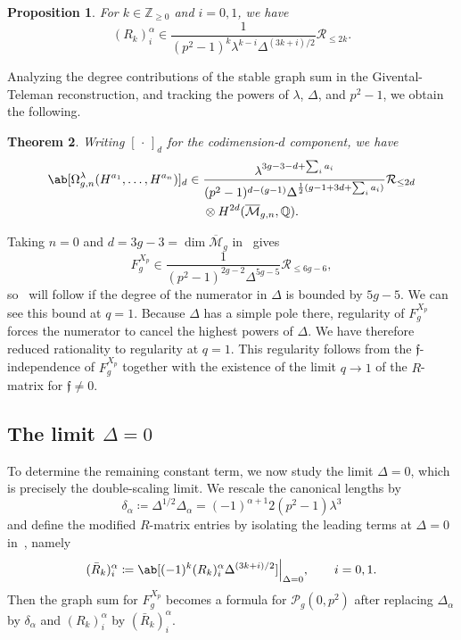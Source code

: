 \documentclass{amsart}
\newtheorem{thm}{Theorem}[section]
\newtheorem{prop}[thm]{Proposition}
\theoremstyle{definition}
\theoremstyle{remark}
\theoremstyle{plain}
\theoremstyle{definition}
\theoremstyle{remark}
\newcommand{\Z}{\mathbb{Z}}
\newcommand{\Q}{\mathbb{Q}}
\newcommand{\Mbar}{\overline{\mathcal{M}}}
\newcommand{\mc}[1]{\mathcal{#1}}
\newcommand{\mf}[1]{\mathfrak{#1}}
\newcommand{\1}{\mathbf{1}}
\newcommand{\2}{\mathbf{2}}
\newcommand{\3}{\mathbf{3}}
\begin{document}
\begin{prop}%
\label{prop:R matrix polynomiality}
    For \(k \in \Z_{\geq0}\) and \(i = 0,1\), we have
    \[ (R_k)_i^{\alpha} \in \frac{1}{(p^2-1)^k \lambda^{k-i}\Delta^{(3k+i)/2}}\mc{R}_{\leq 2k}. \]
\end{prop}

Analyzing the degree contributions of the stable graph sum in the Givental-Teleman reconstruction, and tracking the powers of \(\lambda\), \(\Delta\), and \(p^2-1\), we obtain the following.

\begin{thm}%
\label{thm:local P1 reconstruction}
    Writing \([\,\cdot\,]_d\) for the codimension-\(d\) component, we have
    \begin{align*}
        \ab[\Omega^{\lambda}_{g,n}(H^{a_1},\ldots,H^{a_n})]_d \in{}& \frac{\lambda^{3g-3-d+\sum_i a_i}}{(p^2-1)^{d-(g-1)}\Delta^{\frac{1}{2}(g-1+3d+\sum_i a_i)}}\mc{R}_{\leq 2d} \\
        &\otimes H^{2d}(\Mbar_{g,n},\Q).
    \end{align*}
\end{thm}

Taking \(n=0\) and \(d = 3g-3 = \dim \Mbar_g\) in~ gives
\[ F_g^{X_p} \in \frac{1}{(p^2-1)^{2g-2}\Delta^{5g-5}}\mc{R}_{\leq 6g-6}, \]
so~ will follow if the degree of the numerator in \(\Delta\) is bounded by \(5g-5\). We can see this bound at \(q=1\). Because \(\Delta\) has a simple pole there, regularity of \(F_g^{X_p}\) forces the numerator to cancel the highest powers of \(\Delta\). We have therefore reduced rationality to regularity at \(q=1\). This regularity follows from the \(\mf{f}\)-independence of \(F_g^{X_p}\) together with the existence of the limit \(q \to 1\) of the \(R\)-matrix for \(\mf{f} \neq 0\).

\subsection{The limit \(\Delta = 0\)}%
\label{sub:The limit Delta = 0}

To determine the remaining constant term, we now study the limit \(\Delta = 0\), which is precisely the double-scaling limit. We rescale the canonical lengths by
\[ \delta_{\alpha} \coloneqq \Delta^{1/2}\Delta_{\alpha} = (-1)^{\alpha+1}2(p^2-1)\lambda^3 \]
and define the modified \(R\)-matrix entries by isolating the leading terms at \(\Delta = 0\) in~, namely
\[ (\bar{R}_k)_i^{\alpha} \coloneqq \ab[(-1)^k (R_k)_i^{\alpha}\Delta^{(3k+i)/2}]\Big|_{\Delta=0}, \qquad i = 0,1. \]
Then the graph sum for \(F_g^{X_p}\) becomes a formula for \(\mc{P}_g(0,p^2)\) after replacing \(\Delta_{\alpha}\) by \(\delta_{\alpha}\) and \((R_k)_i^{\alpha}\) by \((\bar{R}_k)_i^{\alpha}\).
\end{document}
